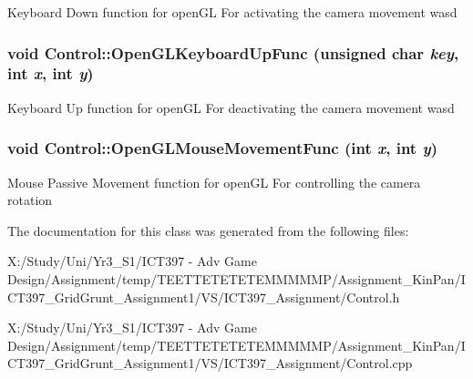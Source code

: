 Keyboard Down function for openGL For activating the camera movement wasd \hypertarget{class_control_c822fb376b27f30d756bbb2643ec6250}{
\subsubsection[OpenGLKeyboardUpFunc]{\setlength{\rightskip}{0pt plus 5cm}void Control::OpenGLKeyboardUpFunc (unsigned char {\em key}, \/  int {\em x}, \/  int {\em y})}}
\label{class_control_c822fb376b27f30d756bbb2643ec6250}


Keyboard Up function for openGL For deactivating the camera movement wasd \hypertarget{class_control_ff386577c26a1672e516606a423320d3}{
\subsubsection[OpenGLMouseMovementFunc]{\setlength{\rightskip}{0pt plus 5cm}void Control::OpenGLMouseMovementFunc (int {\em x}, \/  int {\em y})}}
\label{class_control_ff386577c26a1672e516606a423320d3}


Mouse Passive Movement function for openGL For controlling the camera rotation 

The documentation for this class was generated from the following files:\begin{CompactItemize}
\item 
X:/Study/Uni/Yr3\_\-S1/ICT397 - Adv Game Design/Assignment/temp/TEETTETETETEMMMMMP/Assignment\_\-KinPan/ICT397\_\-GridGrunt\_\-Assignment1/VS/ICT397\_\-Assignment/Control.h\item 
X:/Study/Uni/Yr3\_\-S1/ICT397 - Adv Game Design/Assignment/temp/TEETTETETETEMMMMMP/Assignment\_\-KinPan/ICT397\_\-GridGrunt\_\-Assignment1/VS/ICT397\_\-Assignment/Control.cpp\end{CompactItemize}

